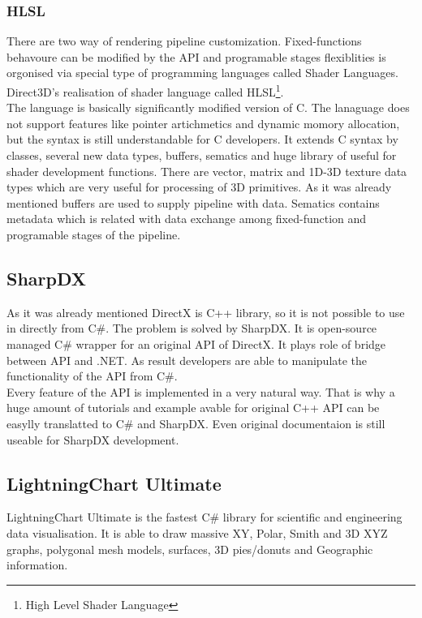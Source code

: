 \documentclass[twoside, english, 11pt]{report}
\begin{document}
\subsubsection{HLSL}
There are two way of rendering pipeline customization. Fixed-functions behavoure can be modified by the API and programable stages flexiblities is orgonised via special type of programming languages called Shader Languages. Direct3D's realisation of shader language called HLSL\footnote{High Level Shader Language}.\\

The language is basically significantly modified version of C. The lanaguage does not support features like pointer artichmetics and dynamic momory allocation, but the syntax is still understandable for C developers. It extends C syntax by classes, several new data types, buffers, sematics and huge library of useful for shader development functions. There are vector, matrix and 1D-3D texture data types which are very useful for processing of 3D primitives. As it was already mentioned buffers are used to supply pipeline with data. Sematics contains metadata which is related with data exchange among fixed-function and programable stages of the pipeline.
\subsection{SharpDX}

As it was already mentioned DirectX is C++ library, so it is not possible to use in directly from C\#. The problem is solved by SharpDX. It is open-source managed C\# wrapper for an original API of DirectX. It plays role of bridge between API and .NET. As result developers are able to manipulate the functionality of the API  from C\#.\\
Every feature of the API is implemented in a very natural way. That is why a huge amount of tutorials and example avable for original C++ API can be easylly translatted to C\# and SharpDX. Even original documentaion is still useable for SharpDX development.

\subsection{LightningChart Ultimate}

LightningChart Ultimate is the fastest C\# library for scientific and engineering data visualisation. It is able to draw massive XY, Polar, Smith and 3D XYZ graphs, polygonal mesh models, surfaces, 3D pies/donuts and Geographic information. 
\end{document}

